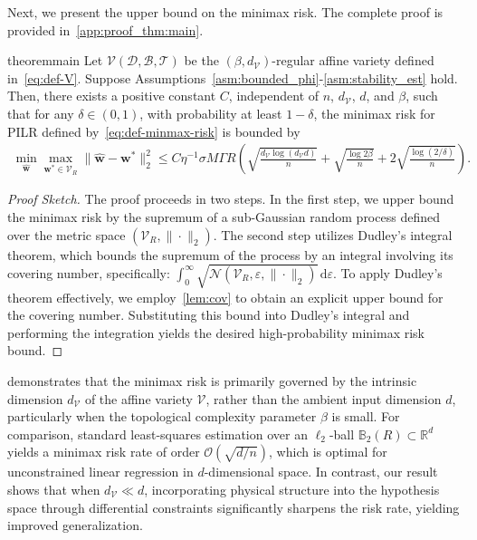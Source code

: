 \documentclass{article}
\theoremstyle{plain}
\theoremstyle{definition}
\theoremstyle{remark}
\begin{document}
Next, we present the upper bound on the minimax risk. The complete proof is provided in~\cref{app:proof_thm:main}.
\begin{restatable}{theorem}{main}\label{thm:main}
Let $\mathcal{V}(\mathscr{D}, \mathcal{B}, \mathcal{T})$ be the $(\beta, d_{\mathcal{V}})$-regular affine variety defined in~\cref{eq:def-V}. Suppose Assumptions~\ref{asm:bounded_phi}-\ref{asm:stability_est} hold. Then, there exists a positive constant $C$, independent of $n$, $d_{\mathcal{V}}$, $d$, and $\beta$, such that for any $\delta \in (0, 1)$, with probability at least $1-\delta$, the minimax risk for PILR defined by~\cref{eq:def-minmax-risk} is bounded by
\begin{align}
    \label{eq:thm:main}
    \min_{\hat{\bm{w}}} \max_{\bm{w}^* \in \mathcal{V}_R} \|\hat{\bm{w}} - \bm{w}^*\|^2_2 \leq C \eta^{-1} \sigma M \Gamma R \left(\sqrt{\frac{d_{\mathcal{V}} \log(d_{\mathcal{V}} d)}{n}} + \sqrt{\frac{\log 2\beta}{n}} + 2\sqrt{\frac{\log(2/\delta)}{n}}\right).
\end{align}
\end{restatable}
\begin{proof}[Proof Sketch]
The proof proceeds in two steps. In the first step, we upper bound the minimax risk by the supremum of a sub-Gaussian random process defined over the metric space $(\mathcal{V}_R, \| \cdot \|_2)$. The second step utilizes Dudley's integral theorem, which bounds the supremum of the process by an integral involving its covering number, specifically: $\int_0^{\infty} \sqrt{\mathcal{N}(\mathcal{V}_R, \varepsilon, \|\cdot\|_2)} \, \mathrm{d}\varepsilon$. To apply Dudley's theorem effectively, we employ~\cref{lem:cov} to obtain an explicit upper bound for the covering number. Substituting this bound into Dudley's integral and performing the integration yields the desired high-probability minimax risk bound.
\end{proof}
 demonstrates that the minimax risk is primarily governed by the intrinsic dimension \( d_{\mathcal{V}} \) of the affine variety \( \mathcal{V} \), rather than the ambient input dimension \( d \), particularly when the topological complexity parameter \( \beta \) is small. For comparison, standard least-squares estimation over an \(\ell_2\)-ball \( \mathbb{B}_2(R) \subset \mathbb{R}^d \) yields a minimax risk rate of order \( \mathcal{O}(\sqrt{d/n}) \), which is optimal for unconstrained linear regression in \( d \)-dimensional space. In contrast, our result shows that when \( d_{\mathcal{V}} \ll d \), incorporating physical structure into the hypothesis space through differential constraints significantly sharpens the risk rate, yielding improved generalization.
\end{document}
